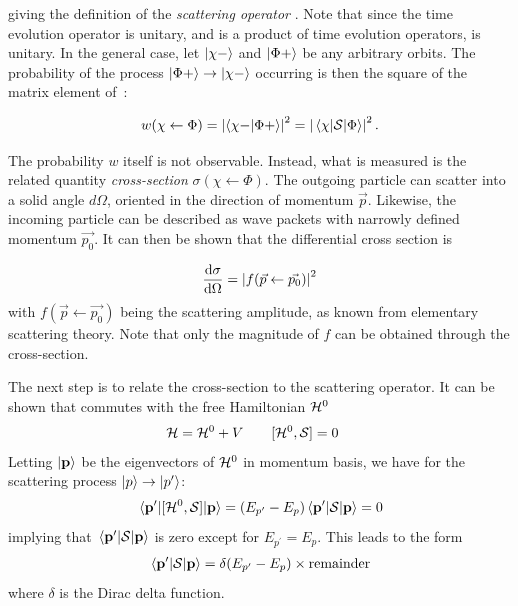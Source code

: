 giving the definition of the \textit{scattering operator} \mscat. Note that
since the time evolution operator is unitary, and \mscat{} is a product of time
evolution operators, \mscat{} is unitary.
In the general case, let \(\ket{\chi -}\) and \(\ket{\Phi +}\) be any arbitrary
orbits. The probability of the process \(\ket{\Phi +}\to\ket{\chi -}\)
occurring is
then the square of the  matrix element of\ \mscat :

\begin{equation*}
  w(\chi \leftarrow \Phi) = \left| \ip{\chi -}{\Phi +} \right|^{2} = \melt{\chi}{\scat}{\Phi}.
\end{equation*}

The probability \(w\) itself is not observable. Instead, what is measured is the related quantity 
\textit{cross-section} \mbox{\(\sigma(\chi \leftarrow \Phi)\)}. The outgoing particle can
scatter into a solid angle \(d\Omega\), oriented in the direction of momentum
\(\vec{p}\). Likewise, the incoming particle can be described as wave packets
with narrowly defined momentum \(\vec{p_{0}}\). It can then be
shown\cite[p.~51]{taylor} that the
differential cross section is

\begin{align*}
  \dv{\sigma}{\Omega}(\vec{p}\leftarrow\vec{p_{0}}) = \left| f(\vec{p}\leftarrow\vec{p_{0}}) \right|^{2}
\end{align*}
with \(f(\vec{p}\leftarrow \vec{p_{0}})\) being the scattering amplitude, as known from elementary scattering
theory. Note that only the magnitude of \(f\) can be obtained through the
cross-section.

The next step is to relate the cross-section to the scattering operator. It
can be shown\cite[p.~40]{taylor} that \mscat{} commutes with the free Hamiltonian \( \mathcal{H}^{0}\)
\begin{align*}
  \mathcal{H} = \mathcal{H}^{0} + V &\qquad [\mathcal{H}^{0}, \mathcal{S}{}] = 0
\end{align*}
Letting \(\ket{\vb{p}}\) be the eigenvectors of \(\mathcal{H}^{0}\) in momentum
basis, we have for the scattering process \(\ket{p}\to\ket{p^{\prime}}\):
\begin{align*}
  \mel{\vb{p}^{\prime}}{[\mathcal{H}^{0}, \mathcal{S}]}{\vb{p}} = (E_{p^{\prime}}-E_{p})\mel{\vb{p}^{\prime}}{\mathcal{S}}{\vb{p}} = 0
\end{align*}
implying that \(\mel{\vb{p}^{\prime}}{\mathcal{S}}{\vb{p}}\) is zero except for
\(E_{p^{\prime}}=E_{p}\). This leads to the form
\begin{align*}
  \mel{\vb{p}^{\prime}}{\mathcal{S}}{\vb{p}} = \delta(E_{p^{\prime}}-E_{p})\times\text{remainder}
\end{align*}
where \(\delta\) is the Dirac delta function.

